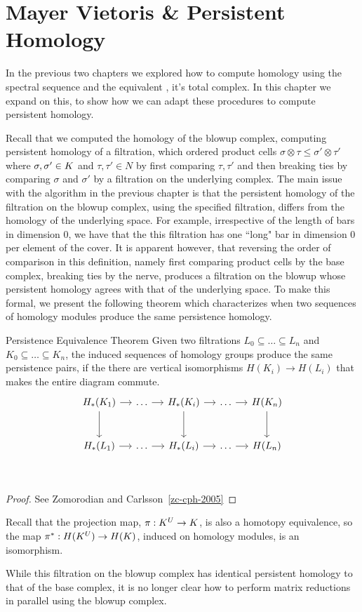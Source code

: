 \chapter{Mayer Vietoris \& Persistent Homology}
In the previous two chapters we explored how to compute homology using the \mv spectral sequence and the equivalent \mvb{}, it's total complex. In this chapter we expand on this, to show how we can adapt these procedures to compute persistent homology.

Recall that we computed the homology of the blowup complex, computing persistent homology of a filtration, which ordered product cells $\sigma \otimes \tau \leq \sigma'  \otimes \tau'$
where $\sigma,\sigma' \in K$ and $\tau, \tau' \in N$ by first comparing $\tau, \tau'$ and then breaking ties by comparing $\sigma$ and $\sigma'$ by a filtration on the underlying complex. The main issue with the algorithm in the previous chapter is that the persistent homology of the filtration on the blowup complex, using the specified filtration, differs from the homology of the underlying space. For example, irrespective of the length of bars in dimension 0, we have that the this filtration has one ``long" bar in dimension 0 per element of the cover. It is apparent however, that reversing the order of comparison in this definition, namely first comparing product cells by the base complex, breaking ties by the nerve, produces a filtration on the blowup whose persistent homology agrees with that of the underlying space. To make this formal, we present the following theorem which characterizes when two sequences of homology modules produce the same persistence homology.
\begin{theorem}{Persistence Equivalence Theorem}
    Given two filtrations $L_0 \subseteq \ldots \subseteq L_n$ and
    $K_0 \subseteq \ldots \subseteq K_n$, the induced sequences of homology
    groups produce the same persistence pairs,
    if the there are vertical isomorphisms $H(K_i) \to H(L_i)$ that makes the entire diagram commute.
\[
\begin{tikzcd}[row sep=large, column sep=small]
    H_*(K_1) \arrow{r}\arrow{d} & \ldots \arrow{r} & H_*(K_i)  \arrow{r}\arrow{d} & \ldots \arrow{r} & H(K_n) \arrow{d} \\
    H_*(L_1) \arrow{r} & \ldots \arrow{r} & H_*(L_i)  \arrow{r} & \ldots \arrow{r} & H(L_n) \\
\end{tikzcd}
\]
\end{theorem}
\begin{proof}
See Zomorodian and Carlsson~\ref{zc-cph-2005}
\end{proof}
Recall that the projection map, $\pi: K^U \to K$, is also a homotopy equivalence, so the map $\pi^*: H(K^U) \to H(K)$,
induced on homology modules, is an isomorphism.

While this filtration on the blowup complex has identical persistent homology to that of the base complex, it is no longer clear how to perform matrix reductions in parallel using the blowup complex. 

